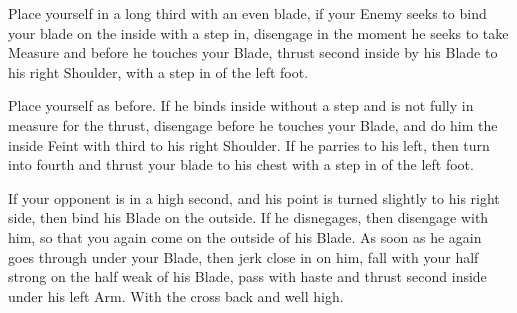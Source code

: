 \newpage


\newpage


\exercise{}

Place yourself in a long third with an even blade, if your Enemy seeks
to bind your blade on the inside with a step in, disengage in the
moment he seeks to take Measure and before he touches your Blade,
thrust second inside by his Blade to his right Shoulder, with a step
in of the left foot.

\exercise{}

Place yourself as before. If he binds inside without a step and is not
fully in measure for the thrust, disengage before he touches your
Blade, and do him the inside Feint with third to his right
Shoulder. If he parries to his left, then turn into fourth and thrust
your blade to his chest with a step in of the left foot.

\exercise{}
If your opponent is in a high second, and his point is turned slightly
to his right side, then bind his Blade on the outside. If he
disnegages, then disengage with him, so that you again come on the
outside of his Blade. As soon as he again goes through under your
Blade, then jerk close in on him, fall with your half strong on the
half weak of his Blade, pass with haste and thrust second inside under
his left Arm. With the cross back and well high.

